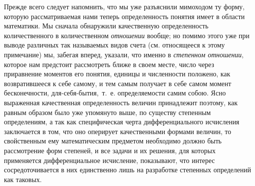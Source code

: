 Прежде всего следует напомнить, что мы уже разъяснили мимоходом ту форму,
которую рассматриваемая нами теперь определенность понятия имеет в области
математики. Мы сначала обнаружили качественную определенность
количественного в количественном {\em отношении}
вообще; но помимо этого уже при выводе различных так называемых видов счета
(см. относящееся к этому примечание) мы, забегая вперед, указали, что
именно в {\em степенном отношении}, которое нам
предстоит рассмотреть ближе в своем месте, число через приравнение моментов
его понятия, единицы и численности положено, как возвратившееся к себе
самому, и тем самым получает в себе самом момент бесконечности,
для-себя-бытия,~т.~е. определяемости самим собою. Ясно выраженная
качественная определенность величин принадлежит поэтому, как равным образом
было уже упомянуто выше, по существу степенным определениям, а так как
специфическая черта дифференциального исчисления заключается в том, что оно
оперирует качественными формами величин, то свойственным ему математическим
предметом необходимо должно быть рассмотрение форм степеней, и все задачи и
их решения, для которых применяется дифференциальное исчисление, показывают,
что интерес сосредоточивается в них единственно лишь на разработке
степенных определений как таковых.

